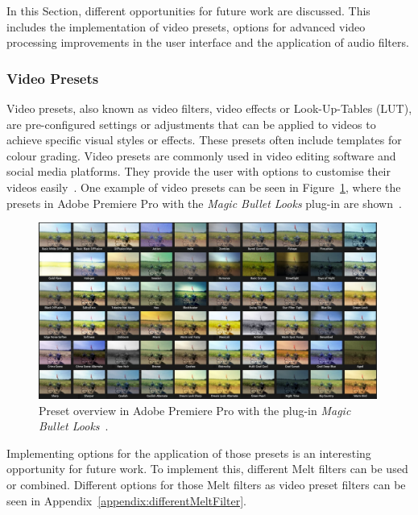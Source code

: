 \documentclass[../MasterThesis.tex]{subfiles}
\begin{document}
In this Section, different opportunities for future work are discussed. This includes the implementation of video presets, options for advanced video processing improvements in the user interface and the application of audio filters.


\subsubsection*{Video Presets}

Video presets, also known as video filters, video effects or Look-Up-Tables (LUT), are pre-configured settings or adjustments that can be applied to videos to achieve specific visual styles or effects. 
These presets often include templates for colour grading. 
Video presets are commonly used in video editing software and social media platforms. They provide the user with options to customise their videos easily~\cite{cc1}.
%
One example of video presets can be seen in Figure~\ref{figure:app}, where the presets in Adobe Premiere Pro with the \textit{Magic Bullet Looks} plug-in are shown~\cite{premierepro, magicbullet}.

\begin{figure}[H]
	
	\centering
	
	\includegraphics[width=0.99\textwidth]{app.jpg}
	
	\caption[Presets in Adobe Premiere Pro (\textit{Magic Bullet Looks}).]{Preset overview in Adobe Premiere Pro with the plug-in \textit{Magic Bullet Looks}~\cite{premierepro, magicbullet}.}
	\label{figure:app}
	
\end{figure}

Implementing options for the application of those presets is an interesting opportunity for future work. To implement this, different Melt filters can be used or combined. Different options for those Melt filters as video preset filters can be seen in Appendix~\ref{appendix:differentMeltFilter}.
\end{document}
